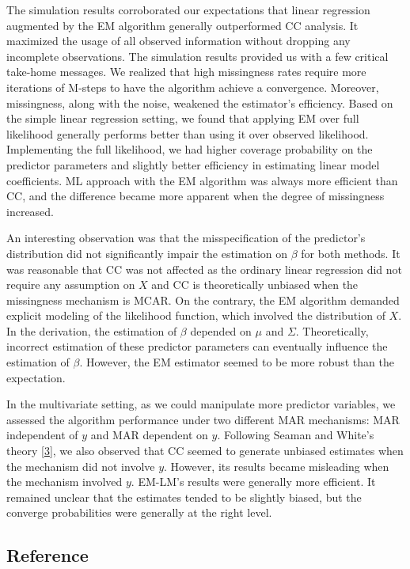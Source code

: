\documentclass[
  twocolumn]{article}
\begin{document}
The simulation results corroborated our expectations that linear
regression augmented by the EM algorithm generally outperformed CC
analysis. It maximized the usage of all observed information without
dropping any incomplete observations. The simulation results provided us
with a few critical take-home messages. We realized that high
missingness rates require more iterations of M-steps to have the
algorithm achieve a convergence. Moreover, missingness, along with the
noise, weakened the estimator's efficiency. Based on the simple linear
regression setting, we found that applying EM over full likelihood
generally performs better than using it over observed likelihood.
Implementing the full likelihood, we had higher coverage probability on
the predictor parameters and slightly better efficiency in estimating
linear model coefficients. ML approach with the EM algorithm was always
more efficient than CC, and the difference became more apparent when the
degree of missingness increased.

An interesting observation was that the misspecification of the
predictor's distribution did not significantly impair the estimation on
\(\beta\) for both methods. It was reasonable that CC was not affected
as the ordinary linear regression did not require any assumption on
\(X\) and CC is theoretically unbiased when the missingness mechanism is
MCAR. On the contrary, the EM algorithm demanded explicit modeling of
the likelihood function, which involved the distribution of \(X\). In
the derivation, the estimation of \(\beta\) depended on \(\mu\) and
\(\Sigma\). Theoretically, incorrect estimation of these predictor
parameters can eventually influence the estimation of \(\beta\).
However, the EM estimator seemed to be more robust than the expectation.

In the multivariate setting, as we could manipulate more predictor
variables, we assessed the algorithm performance under two different MAR
mechanisms: MAR independent of \(y\) and MAR dependent on \(y\).
Following Seaman and White's theory
{[}\protect\hyperlink{ref-seaman2013review}{3}{]}, we also observed that
CC seemed to generate unbiased estimates when the mechanism did not
involve \(y\). However, its results became misleading when the mechanism
involved \(y\). EM-LM's results were generally more efficient. It
remained unclear that the estimates tended to be slightly biased, but
the converge probabilities were generally at the right level.

\hypertarget{reference}{%
\subsection*{Reference}\label{reference}}
\end{document}

